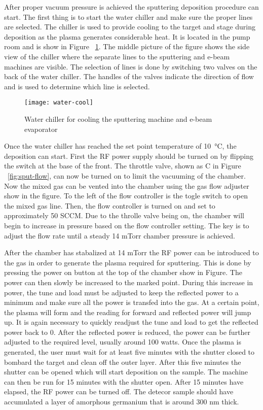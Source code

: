 After proper vacuum pressure is achieved the sputtering deposition procedure can start.
The first thing is to start the water chiller and make sure the proper lines are selected.
The chiller is used to provide cooling to the target and stage during deposition as the plasma generates considerable heat.
It is located in the pump room and is show in Figure ~\ref{fig:water-cool}.
The middle picture of the figure shows the side view of the chiller where the separate lines to the sputtering and e-beam machines are visible.
The selection of lines is done by switching two valves on the back of the water chiller.
The handles of the valves indicate the direction of flow and is used to determine which line is selected.
\begin{figure}[htpb]
\centering
\texttt{[image: water-cool]}
\caption{Water chiller for cooling the sputtering machine and e-beam evaporator}
\label{fig:water-cool}
\end{figure}

Once the water chiller has reached the set point temperature of \SI{10}{\celsius}, the deposition can start.
First the RF power supply should be turned on by flipping the switch at the base of the front.
The throttle valve, shown as C in Figure ~\ref{fig:sput-flow}, can now be turned on to limit the vacuuming of the chamber.
Now the mixed gas can be vented into the chamber using the gas flow adjuster show in the figure.
To the left of the flow controller is the togle switch to open the mixed gas line.
Then, the flow controller is turned on and set to approximately 50 SCCM.
Due to the throlle valve being on, the chamber will begin to increase in pressure based on the flow controller setting.
The key is to adjust the flow rate until a steady 14 mTorr chamber pressure is achieved.

After the chamber has stabalized at 14 mTorr the RF power can be introduced to the gas in order to generate the plasma required for sputtering.
This is done by pressing the power on button at the top of the chamber show in Figure.
The power can then slowly be increased to the marked point.
During this increase in power, the tune and load must be adjusted to keep the reflected power to a minimum and make sure all the power is transfed into the gas.
At a certain point, the plasma will form and the reading for forward and reflected power will jump up.
It is again necessary to quickly readjust the tune and load to get the reflected power back to 0.
After the reflected power is reduced, the power can be further adjusted to the required level, usually around 100 watts.
Once the plasma is generated, the user must wait for at least five minutes with the shutter closed to bombard the target and clean off the outer layer.
After this five minutes the shutter can be opened which will start deposition on the sample.
The machine can then be run for 15 minutes with the shutter open.
After 15 minutes have elapsed, the RF power can be turned off.
The detecor sample should have accumulated a layer of amorphous germanium that is around 300 nm thick.

